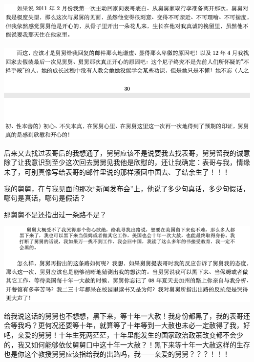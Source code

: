 \documentclass[9pt, b5paper]{article}
\begin{document}
\begin{center}
\includegraphics[width=.9\linewidth]{./pic/backups_plans_20210416_080633.png}
\end{center}

\begin{center}
\includegraphics[width=.9\linewidth]{./pic/backups_plans_20210416_080830.png}
\end{center}

后来又去找过表哥后的我想通了，舅舅应该不是说要我去找表哥，舅舅留我的诚意除了让我意识到至少这次回去舅舅见我他是欣慰的，还让我确定：表哥与我，情缘未了，可别真像写给表哥的邮件里说的那样滚回中国去、了结余生了！！！

我的舅舅，在与我见面的那次“新闻发布会”上，他说了多少句真话，多少句假话，哪句是真话，哪句是假话？

那舅舅不是还指出过一条路不是？

\begin{center}
\includegraphics[width=.9\linewidth]{./pic/backups_plans_20210416_082312.png}
\end{center}

给我说这话的舅舅也不想想，黑下来，等十年一大赦！我身份都黑了，我的表哥还会等我吗？更何况还要等十年，就算等了十年等到一大赦也未必一定赦得了我，好吧，亲爱的舅舅！十年生死两茫茫，十年里能发生的国家政治政策改变都不会少的，我又如何能够依仗舅舅口中这十年一大赦？！黑下来等十年一大赦这样的生存也是你这个教授舅舅应该指给我的出路吗，我——亲爱的舅舅？？？！！！
\end{document}

